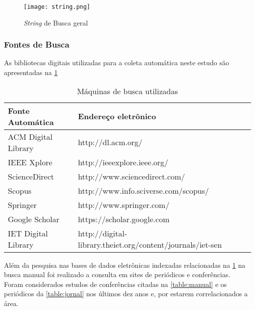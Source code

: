 \begin{figure}[htb]
	\centering
	\caption{\textit{String} de Busca geral}
	\texttt{[image: string.png]}
	\label{fig:string}
\end{figure}

\subsubsection{Fontes de Busca}
As bibliotecas digitais utilizadas para a coleta automática neste estudo são apresentadas na \ref{table:fontes}

\begin{table}[]
	\centering
	\caption{Máquinas de busca utilizadas}
	\label{table:fontes}
	\begin{tabular}{|l|l|}
		\hline
		\textbf{Fonte Automática} & \textbf{Endereço eletrônico}                               \\ \hline
		ACM Digital Library  & http://dl.acm.org/                                         \\ \hline
		IEEE Xplore          & http://ieeexplore.ieee.org/                                \\ \hline
		ScienceDirect        & http://www.sciencedirect.com/                              \\ \hline
		Scopus               & http://www.info.sciverse.com/scopus/                       \\ \hline
		Springer             & http://www.springer.com/                                   \\ \hline
		Google Scholar      & https://scholar.google.com                                 \\ \hline
		IET  Digital Library & http://digital-library.theiet.org/content/journals/iet-sen \\ \hline
	\end{tabular}
\end{table}

Além da pesquisa nas bases de dados eletrônicas indexadas relacionadas na \ref{table:fontes} na busca manual foi realizado a consulta em sites de periódicos e conferências. Foram considerados estudos de conferências citadas na \ref{table:manual} e os periódicos da \ref{table:jornal} nos últimos dez anos e, por estarem correlacionados a área.

